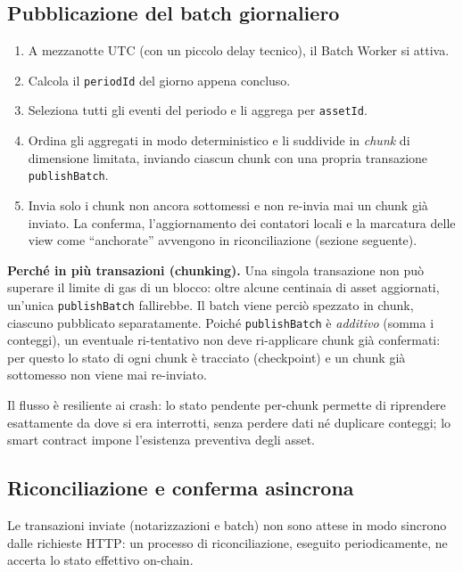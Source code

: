 \documentclass[a4paper,11pt]{article}
\begin{document}
\subsection{Pubblicazione del batch giornaliero}

\begin{enumerate}[leftmargin=*, itemsep=0.1em]
    \item A mezzanotte UTC (con un piccolo delay tecnico), il Batch Worker si attiva.
    \item Calcola il \texttt{periodId} del giorno appena concluso.
    \item Seleziona tutti gli eventi del periodo e li aggrega per \texttt{assetId}.
    \item Ordina gli aggregati in modo deterministico e li suddivide in \emph{chunk} di dimensione limitata, inviando ciascun chunk con una propria transazione \texttt{publishBatch}.
    \item Invia solo i chunk non ancora sottomessi e non re-invia mai un chunk gi\`a inviato. La conferma, l'aggiornamento dei contatori locali e la marcatura delle view come ``anchorate'' avvengono in riconciliazione (sezione seguente).
\end{enumerate}

\noindent\textbf{Perch\'e in pi\`u transazioni (chunking).} Una singola transazione non pu\`o superare il limite di gas di un blocco: oltre alcune centinaia di asset aggiornati, un'unica \texttt{publishBatch} fallirebbe. Il batch viene perci\`o spezzato in chunk, ciascuno pubblicato separatamente. Poich\'e \texttt{publishBatch} \`e \emph{additivo} (somma i conteggi), un eventuale ri-tentativo non deve ri-applicare chunk gi\`a confermati: per questo lo stato di ogni chunk \`e tracciato (checkpoint) e un chunk gi\`a sottomesso non viene mai re-inviato.

\noindent Il flusso \`e resiliente ai crash: lo stato pendente per-chunk permette di riprendere esattamente da dove si era interrotti, senza perdere dati n\'e duplicare conteggi; lo smart contract impone l'esistenza preventiva degli asset.

\subsection{Riconciliazione e conferma asincrona}

Le transazioni inviate (notarizzazioni e batch) non sono attese in modo sincrono dalle richieste HTTP: un processo di riconciliazione, eseguito periodicamente, ne accerta lo stato effettivo on-chain.
\end{document}
